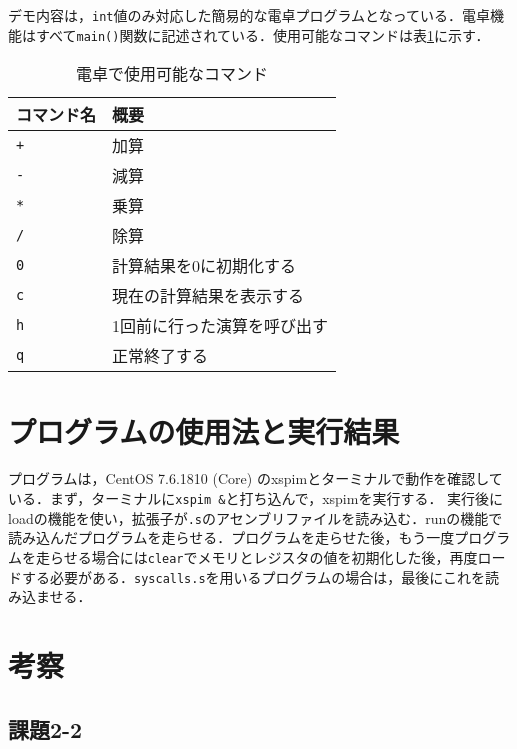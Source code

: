 デモ内容は，\verb|int|値のみ対応した簡易的な電卓プログラムとなっている．電卓機能はすべて\verb|main()|関数に記述されている．使用可能なコマンドは表\ref{tab:commands}に示す．

\begin{table}[b]
\centering
	\caption{電卓で使用可能なコマンド}
	\label{tab:commands}
    	\begin{tabular}{|l|l|}
	\hline
コマンド名&概要\\
	\hline
\verb|+|&加算\\
	\hline
\verb|-|&減算\\
	\hline
\verb|*|&乗算\\
	\hline
\verb|/|&除算\\
	\hline
\verb|0|&計算結果を0に初期化する\\
	\hline
\verb|c|&現在の計算結果を表示する\\
	\hline
\verb|h|&1回前に行った演算を呼び出す\\
	\hline
\verb|q|&正常終了する\\
	\hline

	\end{tabular}
\end{table}


\section{プログラムの使用法と実行結果}\label{sec:howresult}

プログラムは，CentOS 7.6.1810 (Core) のxspimとターミナルで動作を確認している．まず，ターミナルに\verb|xspim &|と打ち込んで，xspimを実行する．
実行後にloadの機能を使い，拡張子が\verb|.s|のアセンブリファイルを読み込む．runの機能で読み込んだプログラムを走らせる．プログラムを走らせた後，もう一度プログラムを走らせる場合には\verb|clear|でメモリとレジスタの値を初期化した後，再度ロードする必要がある．\verb|syscalls.s|を用いるプログラムの場合は，最後にこれを読み込ませる．



\section{考察} \label{sec:review}

\subsection{課題2-2}

